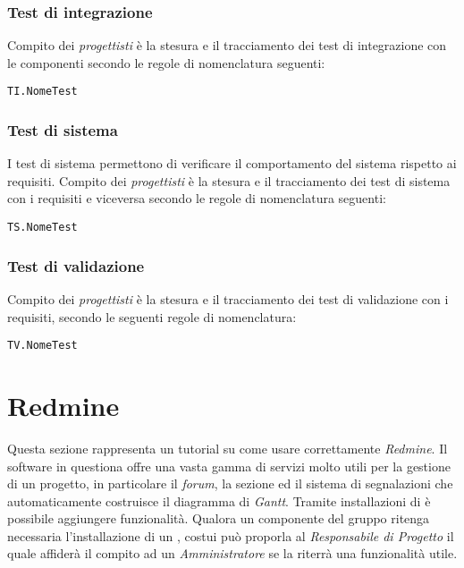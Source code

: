 \documentclass{scalatekids-article}
\begin{document}
\subsubsection{Test di integrazione}

Compito dei \textit{progettisti} è la stesura e il tracciamento dei test di
integrazione con le componenti secondo le regole di nomenclatura seguenti:

\begin{center}
  \verb=TI.NomeTest=
\end{center}

\subsubsection{Test di sistema}

I test di sistema permettono di verificare il comportamento del sistema rispetto
ai requisiti. Compito dei \textit{progettisti} è la stesura e il tracciamento dei test di
sistema con i requisiti e viceversa secondo le regole di nomenclatura seguenti:

\begin{center}
  \verb=TS.NomeTest=
\end{center}

\subsubsection{Test di validazione}

Compito dei \textit{progettisti} è la stesura e il tracciamento dei test di validazione
con i requisiti, secondo le seguenti regole di nomenclatura:

\begin{center}
  \verb=TV.NomeTest=
\end{center}


\newpage
\appendix

\section{Redmine}

\label{sec:redmine}
Questa sezione rappresenta un tutorial su come usare correttamente \textit{Redmine}. Il software in questiona offre una vasta gamma di servizi molto utili per la gestione di un progetto, in particolare il \textit{forum}, la sezione  ed il sistema di segnalazioni che automaticamente costruisce il diagramma di \textit{Gantt}. Tramite installazioni di  è possibile aggiungere funzionalità. Qualora un componente del gruppo ritenga necessaria l'installazione di un , costui può proporla al \textit{Responsabile di Progetto} il quale affiderà il compito ad un \textit{Amministratore} se la riterrà una funzionalità utile.
\end{document}
